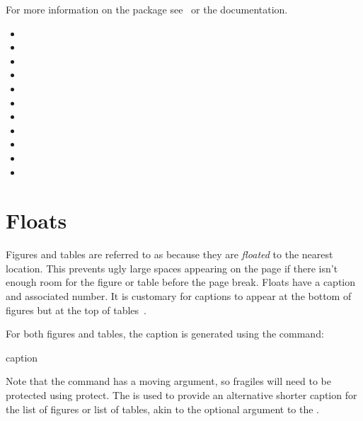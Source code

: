 \bookpagebreak\screenpagebreak
For more information on the  package see
\latexgraphic\ or the  documentation.

\begin{itemize}
\item {}
\item {}
\item {}
\item {}
\item {}
\item {}
\item {}
\item {}
\item {}
\item {}
\item {}
\end{itemize}


\chapter{Floats}
\label{ch:floats}

Figures and tables are referred to as  because they are
\emph{floated} to the nearest location. This prevents ugly large
spaces appearing on the page if there isn't enough room for the
figure or table before the page break. Floats have a caption and
associated number. It is
customary for captions to appear at the bottom of figures but at the
top of tables~\cite{turabian96,oxford}.

For both figures and tables, the caption is generated using the 
command:
\begin{definition}
\gls{caption}
\end{definition}%
Note that the  command has a
moving argument, so
\glspl{fragile} will need to be
protected using \gls{protect}.  The 
 is used to provide an alternative shorter
caption for the list of figures or list of tables, akin to the
optional argument to the .

